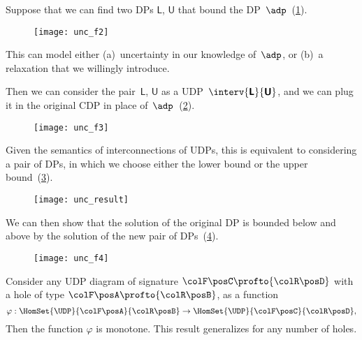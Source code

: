 Suppose that we can find two DPs $\boldsymbol{\mathsf{L}}$, $\boldsymbol{\mathsf{U}}$ that bound the DP~$\adp$~(\cref{fig:consider2}).

\begin{figure}[h!]
    \texttt{[image: unc\_f2]}
    \caption{}
    \label{fig:consider2}
\end{figure}

This can model either (a)~uncertainty in our knowledge of~$\adp$, or (b)~a relaxation that we willingly introduce.

Then we can consider the pair~$\boldsymbol{\mathsf{L}}$,
$\boldsymbol{\mathsf{U}}$ as a UDP~$\interv {\boldsymbol{\mathsf{L}}} {\boldsymbol{\mathsf{U}}}$,
and we can plug it in the original CDP in place of~$\adp$~(\cref{fig:luinside}).

\begin{figure}[h!]
    \texttt{[image: unc\_f3]}
    \caption{}
    \label{fig:luinside}
\end{figure}

Given the semantics of interconnections of UDPs, this is equivalent to considering a pair of DPs, in which we choose either the lower bound or the upper bound~(\cref{fig:pair}).

\begin{figure}[h!]
    \texttt{[image: unc\_result]}
    \caption{}
    \label{fig:pair}
\end{figure}

We can then show that the solution of the original DP is bounded below and above by the solution of the new pair of DPs~(\cref{fig:domin}).

\begin{figure}[h!]
    \texttt{[image: unc\_f4]}
    \caption{}
    \label{fig:domin}
\end{figure}

\begin{proposition}
    Consider any UDP diagram of signature ${\colF\posC }\profto {\colR\posD}$ with a hole
    of type  ${\colF\posA} \profto {\colR\posB}$, as a function
    \begin{equation}
        \varphi: \HomSet{\UDP}{\colF\posA}{\colR\posB} \to  \HomSet{\UDP}{\colF\posC}{\colR\posD},
    \end{equation}
    Then the function $\varphi$ is monotone.
    This result generalizes for any number of holes.
\end{proposition}

